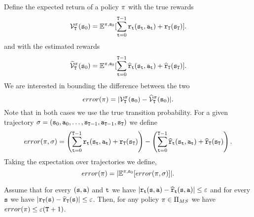 Define the expected return of a policy $\pi$ with the true rewards
\[
\mathcal{V}^\pi_{\tt T}({\tt s}_0)=\mathbb{E}^{\pi,{\tt s}_0}[\sum_{{\tt t}=0}^{{\tt T}-1}
{\tt r}_{\tt t}({\tt s}_{\tt t},{\tt a}_{\tt t})+{\tt r}_{\tt T}({\tt s}_{\tt T})].
\]
and with the estimated rewards
\[
\widehat{\mathcal{V}}^\pi_{\tt T}({\tt s}_0)=\mathbb{E}^{\pi,{\tt s}_0}[\sum_{{\tt t}=0}^{{\tt T}-1}
\widehat{{\tt r}}_{\tt t}({\tt s}_{\tt t},{\tt a}_{\tt t})+\widehat{{\tt r}}_{\tt T}({\tt s}_{\tt T})].
\]
We are interested in bounding the difference between the two
\[
error(\pi)=|\mathcal{V}^\pi_{\tt T}({\tt s}_0)-\widehat{\mathcal{V}}^\pi_{\tt T}({\tt s}_0)|.
\]
Note that in both cases we use the true transition probability. For
a given trajectory $\sigma=({\tt s}_0,{\tt a}_0,\ldots,
{\tt s}_{{\tt T}-1},{\tt a}_{{\tt T}-1},{\tt s}_{\tt T})$ we
define
\[
error(\pi,\sigma)= \left(\sum_{{\tt t}=0}^{{\tt T}-1}
{\tt r}_{\tt t}({\tt s}_{\tt t},{\tt a}_{\tt t})+{\tt r}_{\tt T}({\tt s}_{\tt T})\right)-
\left(\sum_{{\tt t}=0}^{{\tt T}-1}
\widehat{{\tt r}}_{\tt t}({\tt s}_{\tt t},{\tt a}_{\tt t})+\widehat{{\tt r}}_{\tt T}({\tt s}_{\tt T})\right).
\]
Taking the expectation over trajectories we define,
\[
error(\pi)=|\mathbb{E}^{\pi,{\tt s}_0} [error(\pi,\sigma)]|.
\]

\begin{lemma}
\label{lemma:approx-FH-error}
%
Assume that for every $({\tt s},{\tt a})$ and ${\tt t}$ we have
$|{\tt r}_{\tt t}({\tt s},{\tt a})-\widehat{{\tt r}}_{\tt t}({\tt s},{\tt a})|\leq
\varepsilon$ and for every ${\tt s}$ we have
$|{\tt r}_{\tt T}({\tt s})-\widehat{{\tt r}}_{\tt T}({\tt s})|\leq
\varepsilon$. Then, for any policy $\pi\in  {\Pi _{MS}}$ we have
$error(\pi)\leq \varepsilon({\tt T}+1)$.
\end{lemma}

